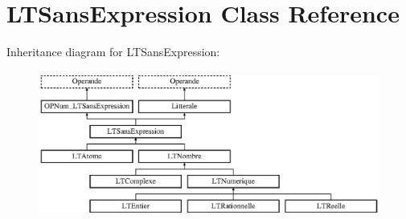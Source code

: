 \hypertarget{class_l_t_sans_expression}{}\section{L\+T\+Sans\+Expression Class Reference}
\label{class_l_t_sans_expression}
Inheritance diagram for L\+T\+Sans\+Expression\+:\begin{figure}[H]
\begin{center}
\leavevmode
\includegraphics[height=4.827586cm]{class_l_t_sans_expression}
\end{center}
\end{figure}
